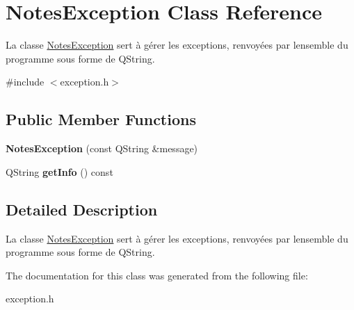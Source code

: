 \hypertarget{classNotesException}{}\section{Notes\+Exception Class Reference}
\label{classNotesException}


La classe \hyperlink{classNotesException}{Notes\+Exception} sert à gérer les exceptions, renvoyées par l\textquotesingle{}ensemble du programme sous forme de Q\+String.  




{\ttfamily \#include $<$exception.\+h$>$}

\subsection*{Public Member Functions}
\begin{DoxyCompactItemize}
\item 
\mbox{\label{classNotesException_af10aca61d1cb993b62e868f0fe9bf144}} 
{\bfseries Notes\+Exception} (const Q\+String \&message)
\item 
\mbox{\label{classNotesException_ac25e667b7e5fafc23a84594bfcc260b6}} 
Q\+String {\bfseries get\+Info} () const
\end{DoxyCompactItemize}


\subsection{Detailed Description}
La classe \hyperlink{classNotesException}{Notes\+Exception} sert à gérer les exceptions, renvoyées par l\textquotesingle{}ensemble du programme sous forme de Q\+String. 

The documentation for this class was generated from the following file\+:\begin{DoxyCompactItemize}
\item 
exception.\+h\end{DoxyCompactItemize}
